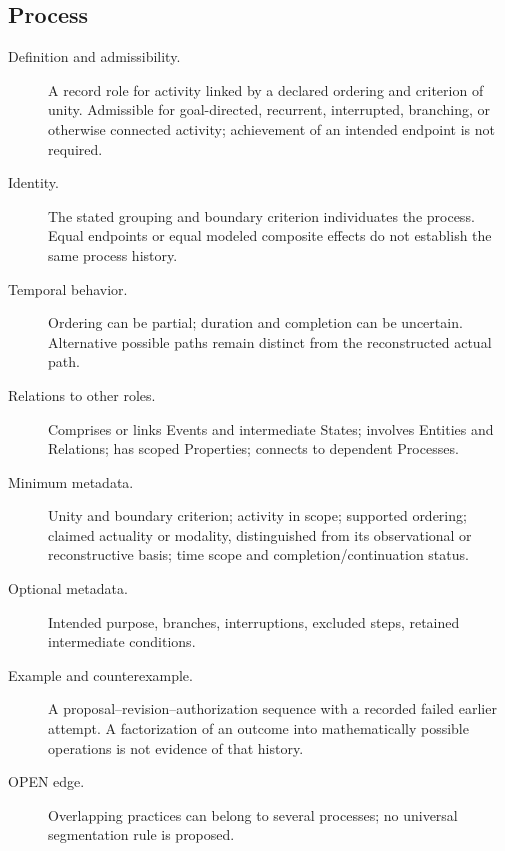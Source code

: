 \documentclass[11pt,a4paper]{article}
\begin{document}
\subsection{Process}
\begin{description}
\item[Definition and admissibility.] A record role for activity linked by a declared ordering and criterion of unity. Admissible for goal-directed, recurrent, interrupted, branching, or otherwise connected activity; achievement of an intended endpoint is not required.
\item[Identity.] The stated grouping and boundary criterion individuates the process. Equal endpoints or equal modeled composite effects do not establish the same process history.
\item[Temporal behavior.] Ordering can be partial; duration and completion can be uncertain. Alternative possible paths remain distinct from the reconstructed actual path.
\item[Relations to other roles.] Comprises or links Events and intermediate States; involves Entities and Relations; has scoped Properties; connects to dependent Processes.
\item[Minimum metadata.] Unity and boundary criterion; activity in scope; supported ordering; claimed actuality or modality, distinguished from its observational or reconstructive basis; time scope and completion/continuation status.
\item[Optional metadata.] Intended purpose, branches, interruptions, excluded steps, retained intermediate conditions.
\item[Example and counterexample.] A proposal--revision--authorization sequence with a recorded failed earlier attempt. A factorization of an outcome into mathematically possible operations is not evidence of that history.
\item[OPEN edge.] Overlapping practices can belong to several processes; no universal segmentation rule is proposed.
\end{description}
\end{document}
